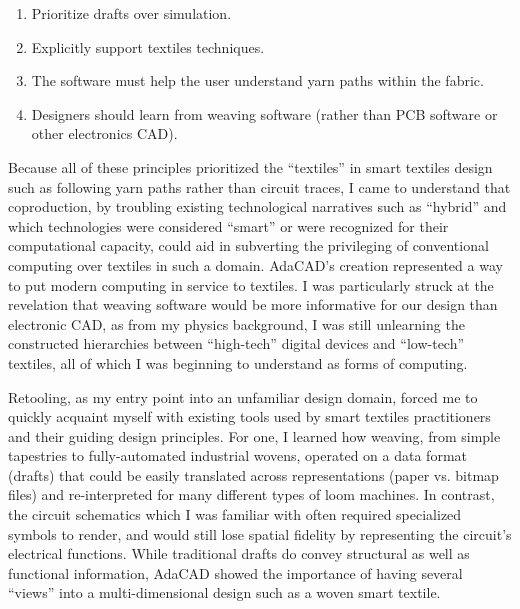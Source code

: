 \begin{enumerate}
\item Prioritize drafts over simulation.
\item Explicitly support textiles techniques.
\item The software must help the user understand yarn paths within the fabric.
\item Designers should learn from weaving software (rather than PCB software or other electronics CAD).
\end{enumerate}

Because all of these principles prioritized the ``textiles'' in smart textiles design such as following yarn paths rather than circuit traces, I came to understand that coproduction, by troubling existing technological narratives such as ``hybrid'' and which technologies were considered ``smart'' or were recognized for their computational capacity, could aid in subverting the privileging of conventional computing over textiles in such a domain. AdaCAD's creation represented a way to put modern computing in service to textiles. I was particularly struck at the revelation that weaving software would be more informative for our design than electronic CAD, as from my physics background, I was still unlearning the constructed hierarchies between ``high-tech'' digital devices and ``low-tech'' textiles, all of which I was beginning to understand as forms of computing.

Retooling, as my entry point into an unfamiliar design domain, forced me to quickly acquaint myself with existing tools used by smart textiles practitioners and their guiding design principles. For one, I learned how weaving, from simple tapestries to fully-automated industrial wovens, operated on a data format (drafts) that could be easily translated across representations (paper vs. bitmap files) and re-interpreted for many different types of loom machines. In contrast, the circuit schematics which I was familiar with often required specialized symbols to render, and would still lose spatial fidelity by representing the circuit's electrical functions. While traditional drafts do convey structural as well as functional information, AdaCAD showed the importance of having several ``views'' into a multi-dimensional design such as a woven smart textile. 

 
